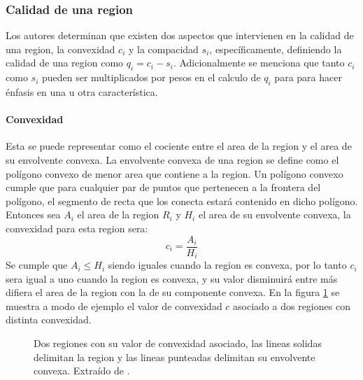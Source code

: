 \subsubsection{Calidad de una region}
Los autores determinan que existen dos aspectos que intervienen en la calidad de una region, la convexidad $c_i$ y la compacidad $s_i$, específicamente, definiendo la calidad de una region como $q_i = c_i - s_i$. Adicionalmente se menciona que tanto $c_i$ como $s_i$ pueden ser multiplicados por pesos en el calculo de $q_i$ para  para hacer énfasis en una u otra característica.

\paragraph{Convexidad}
Esta se puede representar como el cociente entre el area de la region y el area de su envolvente convexa. La envolvente convexa de una region se define como el polígono convexo de menor area que contiene a la region. Un polígono convexo cumple que para cualquier par de puntos que pertenecen a la frontera del polígono, el segmento de recta que los conecta estará contenido en dicho polígono. Entonces sea $A_i$ el area de la region $R_i$ y $H_i$ el area de su envolvente convexa, la convexidad para esta region sera:
\begin{equation}
  c_i=\frac{A_i}{H_i}
\end{equation}
Se cumple que $A_i \leq H_i$ siendo iguales cuando la region es convexa, por lo tanto $c_i$ sera igual a uno cuando la region es convexa, y su valor disminuirá entre más difiera el area de la region con la de su componente convexa. En la figura \ref{fig:ejemplConvexidad} se muestra a modo de ejemplo el valor de convexidad $c$ asociado a dos regiones con distinta convexidad.
\begin{figure}[H]
  \centering
  \hspace{2cm}
  \qquad
  \caption[Regiones convexas.]{Dos regiones con su valor de convexidad asociado, las lineas solidas delimitan la region y las lineas punteadas delimitan su envolvente convexa. Extraído de \cite{Liu2015}.}\label{fig:ejemplConvexidad}
\end{figure}
